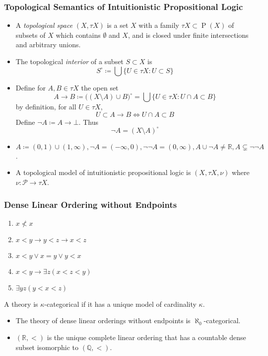 \documentclass[UTF8,aspectratio=43,11pt,colorlinks,compress,openany]{beamer}%
\begin{document}
\begin{frame}\frametitle{Topological Semantics of Intuitionistic Propositional Logic}
\begin{itemize}
	\item A \emph{topological space} $(X,\tau X)$ is a set $X$ with a family $\tau X\subset\operatorname{P}(X)$ of subsets of $X$ which contains $\emptyset$ and $X$, and is closed under finite intersections and arbitrary unions.
	\item The topological \emph{interior} of a subset $S\subset X$ is
	\[S^\circ\coloneqq \bigcup\big\{U\in\tau X: U\subset S\big\}\]
	\item Define for $A,B\in\tau X$ the open set
	\[A\to B \coloneqq \big((X\setminus A)\cup B\big)^\circ=\bigcup\big\{U\in\tau X:U\cap A\subset B\big\}\]
	by definition, for all $U\in\tau X$,
	\[U\subset A\to B\iff U\cap A\subset B\]
	Define $\neg A\coloneqq A\to\bot$. Thus
	\[\neg A=(X\setminus A)^\circ\]
	\item $A\coloneqq (0,1)\cup(1,\infty), \neg A=(-\infty,0), \neg\neg A=(0,\infty), A\cup\neg A\ne\mathbb{R}, A\subsetneq\neg\neg A$.
	\item A topological model of intuitionistic propositional logic is $(X,\tau X,\nu)$ where $\nu:\mathcal{P}\to\tau X$.
\end{itemize}
\end{frame}

\begin{frame}\frametitle{Dense Linear Ordering without Endpoints}
	\begin{enumerate}
		\item $x\nless x$
		\item $x<y\to y<z\to x<z$
		\item $x<y\vee x=y\vee y<x$
		\item $x<y\to\exists z(x<z<y)$
		\item $\exists yz(y<x<z)$
	\end{enumerate}
	\begin{definition}
	A theory is $\kappa$-categorical if it has a unique model of cardinality $\kappa$.
	\end{definition}
	\begin{theorem}[Cantor]
		\begin{itemize}
			\item The theory of dense linear orderings without endpoints is $\aleph_0$-categorical.
			\item $(\mathbb{R},<)$ is the unique complete linear ordering that has a countable dense subset isomorphic to $(\mathbb{Q},<)$.
		\end{itemize}
	\end{theorem}
\end{frame}
\end{document}
